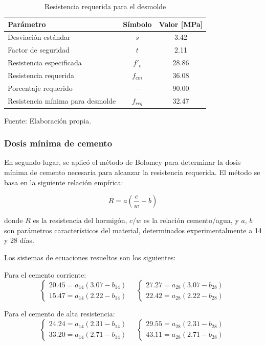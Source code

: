 \begin{table}[H]
\centering
\renewcommand{\arraystretch}{1.15}
\caption{Resistencia requerida para el desmolde}
\begin{tabular}{lcc}
\hline
\textbf{Parámetro} & \textbf{Símbolo} & \textbf{Valor [MPa]} \\ \hline
Desviación estándar & $s$ & 3.42 \\
Factor de seguridad & $t$ & 2.11 \\
Resistencia especificada & $f'_c$ & 28.86 \\
Resistencia requerida & $f_{cm}$ & 36.08 \\
Porcentaje requerido & -- & 90.00 \\
Resistencia mínima para desmolde & $f_{req}$ & 32.47 \\ \hline
\end{tabular}
\begin{center}
Fuente: Elaboración propia.
\end{center}
\end{table}

\subsubsection*{Dosis mínima de cemento}

En segundo lugar, se aplicó el método de Bolomey para determinar la dosis mínima de cemento necesaria para alcanzar la resistencia requerida.  
El método se basa en la siguiente relación empírica:

\[
R = a\left(\frac{c}{w} - b\right)
\]

donde $R$ es la resistencia del hormigón, $c/w$ es la relación cemento/agua, y $a$, $b$ son parámetros característicos del material, determinados experimentalmente a 14 y 28 días.  

Los sistemas de ecuaciones resueltos son los siguientes:

Para el cemento corriente:
\[
\begin{cases}
20.45 = a_{14}(3.07 - b_{14}) \\
15.47 = a_{14}(2.22 - b_{14})
\end{cases}
\quad
\begin{cases}
27.27 = a_{28}(3.07 - b_{28}) \\
22.42 = a_{28}(2.22 - b_{28})
\end{cases}
\]

Para el cemento de alta resistencia:
\[
\begin{cases}
24.24 = a_{14}(2.31 - b_{14}) \\
33.20 = a_{14}(2.71 - b_{14})
\end{cases}
\quad
\begin{cases}
29.55 = a_{28}(2.31 - b_{28}) \\
43.11 = a_{28}(2.71 - b_{28})
\end{cases}
\]

